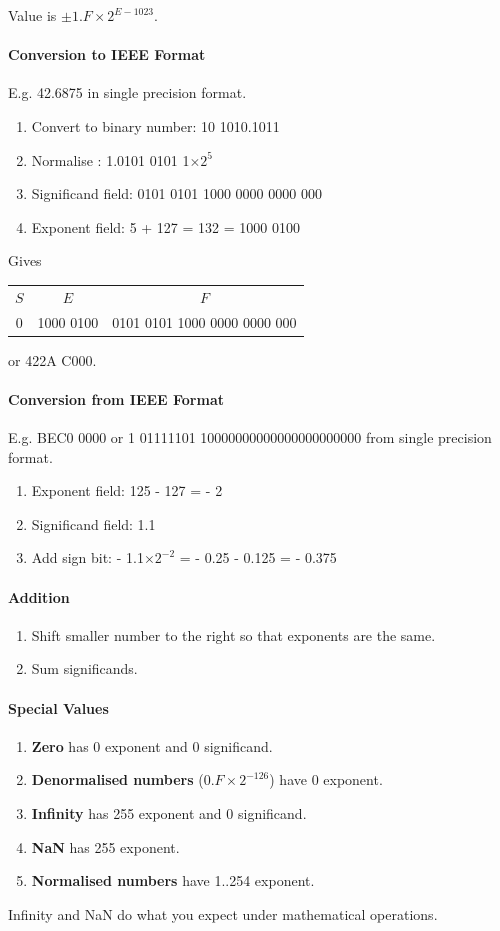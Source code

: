 \documentclass[twocolumn,english]{article}
\providecommand{\tabularnewline}{\\}
\begin{document}
Value is $\pm1.F\times2^{E-1023}$.


\paragraph{Conversion to IEEE Format}

E.g. 42.6875 in single precision format.
\begin{enumerate}
\item Convert to binary number: 10 1010.1011
\item Normalise : 1.0101 0101 1$\times2^{5}$
\item Significand field: 0101 0101 1000 0000 0000 000
\item Exponent field: 5 + 127 = 132 = 1000 0100
\end{enumerate}
Gives %
\begin{tabular}{ccc}
\toprule 
$S$ & $E$ & $F$\tabularnewline
0 & 1000 0100 & 0101 0101 1000 0000 0000 000\tabularnewline
\bottomrule
\end{tabular} or 422A C000.


\paragraph{Conversion from IEEE Format}

E.g. BEC0 0000 or 1 01111101 10000000000000000000000 from single precision
format.
\begin{enumerate}
\item Exponent field: 125 - 127 = - 2
\item Significand field: 1.1
\item Add sign bit: - 1.1$\times2^{-2}$ = - 0.25 - 0.125 = - 0.375
\end{enumerate}

\paragraph{Addition}
\begin{enumerate}
\item Shift smaller number to the right so that exponents are the same.
\item Sum significands.
\end{enumerate}

\paragraph{Special Values}
\begin{enumerate}
\item \textbf{Zero} has 0 exponent and 0 significand.
\item \textbf{Denormalised numbers} ($0.F\times2^{-126}$) have 0 exponent.
\item \textbf{Infinity} has 255 exponent and 0 significand.
\item \textbf{NaN} has 255 exponent.
\item \textbf{Normalised numbers} have 1..254 exponent.
\end{enumerate}
Infinity and NaN do what you expect under mathematical operations.
\end{document}
